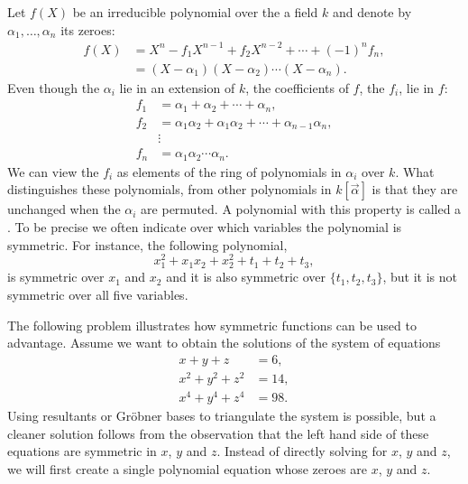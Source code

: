 Let $f(X)$ be an irreducible polynomial over the a field $k$ and
denote by $\alpha_1, \ldots, \alpha_n$ its zeroes:
\[
\begin{aligned}
  f(X) &= X^n - f_1 X^{n-1} + f_2 X^{n-2} + \cdots +(-1)^n  f_n,\\
       &= (X - \alpha_1) (X - \alpha_2) \cdots (X - \alpha_n).
\end{aligned}
\]
Even though the $\alpha_i$ lie in an extension of $k$, the
coefficients of $f$, the $f_i$, lie in $f$:
\[
\begin{aligned}
f_1 &= \alpha_1 + \alpha_2 + \cdots + \alpha_n, \\
f_2 &= \alpha_1 \alpha_2 + \alpha_1 \alpha_2 + \cdots 
     + \alpha_{n-1} \alpha_n, \\
  & \vdots \\
f_n &= \alpha_1 \alpha_2 \cdots \alpha_n.
\end{aligned}
\]
We can view the $f_i$ as elements of the ring of polynomials in
$\alpha_i$ over $k$.  What distinguishes these polynomials, from other
polynomials in $k[\vec{\alpha}]$ is that they are unchanged when the
$\alpha_i$ are permuted.  A polynomial with this property is called a
.  To be precise we often indicate over which
variables the polynomial is symmetric.  For instance, the following
polynomial,
\[
x_1^2 + x_1 x_2 + x_2^2 + t_1 + t_2 + t_3,
\]
is symmetric over $ x_1$ and $x_2$ and it is also symmetric over
$\{t_1, t_2, t_3\}$, but it is not symmetric over all five variables.

The following problem illustrates how symmetric functions can be used
to advantage.  Assume we want to obtain the solutions of the system of
equations
\begin{equation}\label{TripleSymm:Eq}
\begin{aligned}
x   + y   + z   &= 6, \\
x^2 + y^2 + z^2 &= 14,\\
x^4 + y^4 + z^4 &= 98.
\end{aligned}
\end{equation}
Using resultants or Gr\"obner bases to triangulate the system is
possible, but a cleaner solution follows from the observation that the
left hand side of these equations are symmetric in $x$, $y$ and $z$.
Instead of directly solving for $x$, $y$ and $z$, we will first create
a single polynomial equation  whose zeroes are $x$, $y$ and $z$.

